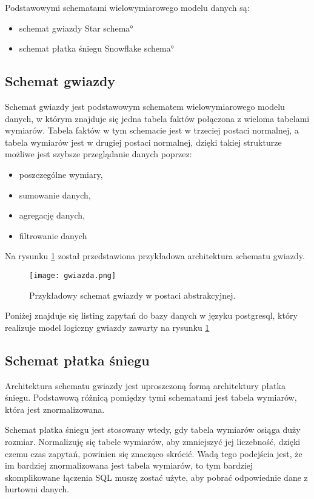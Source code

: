 Podstawowymi schematami wielowymiarowego modelu danych są:
\begin{itemize}
 \item schemat gwiazdy \ang{Star schema} 
 \item schemat płatka śniegu \ang{Snowflake schema}
\end{itemize}

\subsection{Schemat gwiazdy}
Schemat gwiazdy jest podstawowym schematem wielowymiarowego modelu danych,
 w którym znajduje się jedna tabela faktów połączona z wieloma tabelami wymiarów.
Tabela faktów w tym schemacie jest w trzeciej postaci normalnej, a tabela wymiarów jest w drugiej postaci normalnej,
dzięki takiej strukturze możliwe jest szybsze przeglądanie danych poprzez:
\begin{itemize}
 \item poszczególne wymiary,
 \item sumowanie danych,
 \item agregację danych,
 \item filtrowanie danych
\end{itemize}

Na rysunku  \ref{fig:gwiazda} został przedstawiona przykładowa architektura schematu gwiazdy.
\begin{center}
\begin{figure}[H]
  \begin{center}
    \texttt{[image: gwiazda.png]}
  \end{center}
  \caption{Przykładowy schemat gwiazdy w postaci abstrakcyjnej. }
    \label{fig:gwiazda}
\end{figure}
\end{center}
Poniżej znajduje się listing zapytań do bazy danych w języku postgresql,
 który realizuje model logiczny gwiazdy zawarty na rysunku \ref{fig:gwiazda}

\subsection{Schemat płatka śniegu}
Architektura schematu gwiazdy jest uproszczoną formą architektury płatka śniegu.
Podstawową różnicą pomiędzy tymi schematami jest tabela wymiarów, która jest znormalizowana.

Schemat płatka śniegu jest stosowany wtedy, gdy tabela wymiarów osiąga duży rozmiar.
Normalizuję się tabele wymiarów, aby zmniejszyć jej liczebność, dzięki czemu czas zapytań, 
powinien się znacząco skrócić. 
Wadą tego podejścia jest, że im bardziej znormalizowana jest tabela wymiarów,  
to tym bardziej skomplikowane łączenia SQL muszę zostać użyte, aby pobrać odpowiednie
dane z hurtowni danych. \cite{cube}


